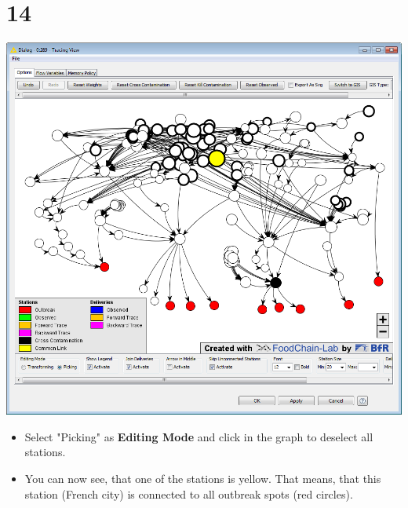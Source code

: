\documentclass{beamer}
\begin{document}
\section{14}
\begin{frame}
	\begin{center}
  		\includegraphics[height=0.6\textheight]{14.png}
	\end{center}
	\begin{itemize}
		\item Select "Picking" as \textbf{Editing Mode} and click in the graph to deselect all stations.
		\item You can now see, that one of the stations is yellow. That means, that this station (French city) is connected to all outbreak spots (red circles).
	\end{itemize}
\end{frame}
\end{document}
